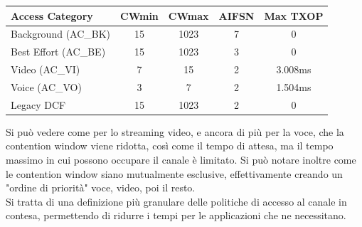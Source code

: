 \begin{tabular}{|l|c|c|c|c|}
	\hline
	\textbf{Access Category} & \textbf{CWmin} & \textbf{CWmax} & \textbf{AIFSN} & \textbf{Max TXOP} \\ 
	\hline
	Background (AC\_BK) & 15 & 1023 & 7 & 0 \\ 
	\hline
	Best Effort (AC\_BE) & 15 & 1023 & 3 & 0 \\ 
	\hline
	Video (AC\_VI) & 7 & 15 & 2 & 3.008ms \\ 
	\hline
	Voice (AC\_VO) & 3 & 7 & 2 & 1.504ms \\ 
	\hline
	Legacy DCF & 15 & 1023 & 2 & 0 \\ 
	\hline
\end{tabular}

Si può vedere come per lo streaming video, e ancora di più per la voce, che la contention window viene ridotta, così come il tempo di attesa, ma il tempo massimo in cui possono occupare il canale è limitato. Si può notare inoltre come le contention window siano mutualmente esclusive, effettivamente creando un "ordine di priorità" voce, video, poi il resto.\\

Si tratta di una definizione più granulare delle politiche di accesso al canale in contesa, permettendo di ridurre i tempi per le applicazioni che ne necessitano.\\

